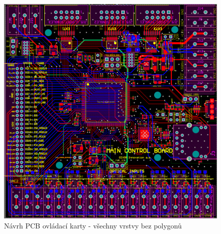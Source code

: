 \begin{figure}[ht!]
    \centering
    \includegraphics[width = 1\textwidth]{obrazky/all_layers_no_poly_control.png}
    \caption{Návrh PCB ovládací karty - všechny vrstvy bez polygonů}
    \label{fig:Všechny vrstvy bez polygonů control}
\end{figure}
    





